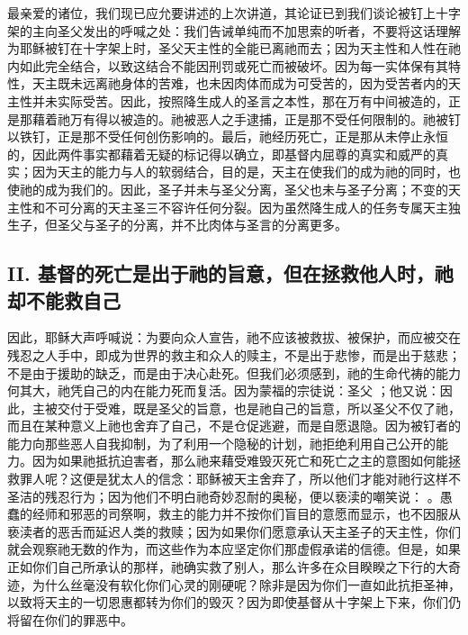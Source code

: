 最亲爱的诸位，我们现已应允要讲述的上次讲道，其论证已到我们谈论被钉上十字架的主向圣父发出的呼喊之处：我们告诫单纯而不加思索的听者，不要将这话理解为耶稣被钉在十字架上时，圣父天主性的全能已离祂而去；因为天主性和人性在祂内如此完全结合，以致这结合不能因刑罚或死亡而被破坏。因为每一实体保有其特性，天主既未远离祂身体的苦难，也未因肉体而成为可受苦的，因为受苦者内的天主性并未实际受苦。因此，按照降生成人的圣言之本性，那在万有中间被造的，正是那藉着祂万有得以被造的。祂被恶人之手逮捕，正是那不受任何限制的。祂被钉以铁钉，正是那不受任何创伤影响的。最后，祂经历死亡，正是那从未停止永恒的，因此两件事实都藉着无疑的标记得以确立，即基督内屈尊的真实和威严的真实；因为天主的能力与人的软弱结合，目的是，天主在使我们的成为祂的同时，也使祂的成为我们的。因此，圣子并未与圣父分离，圣父也未与圣子分离；不变的天主性和不可分离的天主圣三不容许任何分裂。因为虽然降生成人的任务专属天主独生子，但圣父与圣子的分离，并不比肉体与圣言的分离更多。\par


\subsection{II. 基督的死亡是出于祂的旨意，但在拯救他人时，祂却不能救自己}

因此，耶稣大声呼喊说：为要向众人宣告，祂不应该被救拔、被保护，而应被交在残忍之人手中，即成为世界的救主和众人的赎主，不是出于悲惨，而是出于慈悲；不是由于援助的缺乏，而是由于决心赴死。但我们必须感到，祂的生命代祷的能力何其大，祂凭自己的内在能力死而复活。因为蒙福的宗徒说：圣父 ；他又说：因此，主被交付于受难，既是圣父的旨意，也是祂自己的旨意，所以圣父不仅了祂，而且在某种意义上祂也舍弃了自己，不是仓促逃避，而是自愿退隐。因为被钉者的能力向那些恶人自我抑制，为了利用一个隐秘的计划，祂拒绝利用自己公开的能力。因为如果祂抵抗迫害者，那么祂来藉受难毁灭死亡和死亡之主的意图如何能拯救罪人呢？这便是犹太人的信念：耶稣被天主舍弃了，所以他们才能对祂行这样不圣洁的残忍行为；因为他们不明白祂奇妙忍耐的奥秘，便以亵渎的嘲笑说： 。愚蠢的经师和邪恶的司祭啊，救主的能力并不按你们盲目的意愿而显示，也不因服从亵渎者的恶舌而延迟人类的救赎；因为如果你们愿意承认天主圣子的天主性，你们就会观察祂无数的作为，而这些作为本应坚定你们那虚假承诺的信德。但是，如果正如你们自己所承认的那样，祂确实救了别人，那么许多在众目睽睽之下行的大奇迹，为什么丝毫没有软化你们心灵的刚硬呢？除非是因为你们一直如此抗拒圣神，以致将天主的一切恩惠都转为你们的毁灭？因为即使基督从十字架上下来，你们仍将留在你们的罪恶中。\par

